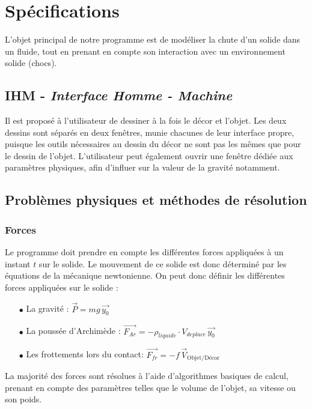 \section{Spécifications}
L'objet principal de notre programme est de modéliser la chute d'un solide dans un
fluide, tout en prenant en compte son interaction avec un environnement solide (chocs).

\subsection{IHM - \emph{Interface Homme - Machine}}
Il est proposé à l'utilisateur de dessiner à la fois le décor et l'objet.
Les deux dessins sont séparés en deux fenêtres, munie chacunes de leur interface propre,
puisque les outils nécessaires au dessin du décor ne sont pas les mêmes que pour le dessin de l'objet.
L'utilisateur peut également ouvrir une fenêtre dédiée aux paramètres physiques, afin d'influer
sur la valeur de la gravité notamment.

\subsection{Problèmes physiques et méthodes de résolution}
\subsubsection{Forces}
Le programme doit prendre en compte les différentes forces appliquées à 
un instant $t$ sur le solide. Le mouvement de ce solide est donc déterminé
par les équations de la mécanique newtonienne.
On peut donc définir les différentes forces appliquées sur le solide :

\begin{itemize}
\item[$\bullet$] La gravité : \dotfill{} $\overrightarrow{P} = mg\, \overrightarrow{y_0}$ 
\item[$\bullet$] La poussée d'Archimède : \dotfill{} $\overrightarrow{F_{Ar}} = -\rho_{liquide}\cdot V_{deplace} \, \overrightarrow{y_0} $
\item[$\bullet$] Les frottements lors du contact: \dotfill{}$\overrightarrow{F_{fr}} = -f \,\overrightarrow{V}_{\text{Objet/Décor}}$
\end{itemize}

La majorité des forces sont résolues à l'aide d'algorithmes basiques de
calcul, prenant en compte des paramètres telles que le volume de l'objet,
sa vitesse ou son poids.
